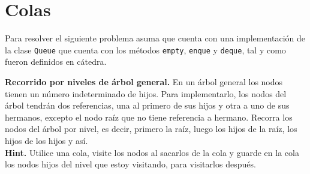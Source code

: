 \documentclass[dcc, usedate]{fcfmcourse}
\begin{document}
\section*{Colas}
Para resolver el siguiente problema asuma que cuenta con una implementación de la clase \texttt{Queue} que cuenta con los métodos \texttt{empty}, \texttt{enque} y \texttt{deque}, tal y como fueron definidos en cátedra.\\
\begin{problems}
\problem \textbf{Recorrido por niveles de árbol general.} En un árbol general los nodos tienen un número indeterminado de hijos. Para implementarlo, los nodos del árbol tendrán dos referencias, una al primero de sus hijos y otra a uno de sus hermanos, excepto el nodo raíz que no tiene referencia a hermano. Recorra los nodos del árbol por nivel, es decir, primero la raíz, luego los hijos de la raíz, los hijos de los hijos y así.\\
\textbf{Hint.} Utilice una cola, visite los nodos al sacarlos de la cola y guarde en la cola los nodos hijos del nivel que estoy visitando, para visitarlos después.
\end{problems}
\end{document}
